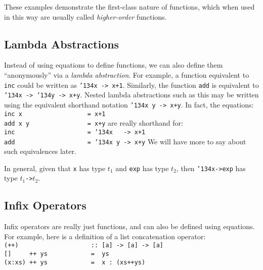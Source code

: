 These examples demonstrate the first-class nature of functions, which
when used in this way are usually called {\em higher-order} functions.

\subsection{Lambda Abstractions}
\label{tut-lambda}

Instead of using equations to define functions, we can also define
them ``anonymously'' via a {\em lambda abstraction}.  For example, a
function equivalent to \mbox{\tt inc} could be written as \mbox{\tt {\char'134}x\ ->\ x+1}.
Similarly, the function \mbox{\tt add} is equivalent to \mbox{\tt {\char'134}x\ ->\ {\char'134}y\ ->\ x+y}.
Nested lambda abstractions such as this may be written using the
equivalent shorthand notation \mbox{\tt {\char'134}x\ y\ ->\ x+y}.  In fact, the equations:
\bprog
\mbox{\tt inc\ x\ \ \ \ \ \ \ \ \ \ \ \ \ \ \ \ \ \ =\ x+1}\\
\mbox{\tt add\ x\ y\ \ \ \ \ \ \ \ \ \ \ \ \ \ \ \ =\ x+y}
\eprog 
are really shorthand for:
\bprog
\mbox{\tt inc\ \ \ \ \ \ \ \ \ \ \ \ \ \ \ \ \ \ \ \ =\ {\char'134}x\ \ \ ->\ x+1}\\
\mbox{\tt add\ \ \ \ \ \ \ \ \ \ \ \ \ \ \ \ \ \ \ \ =\ {\char'134}x\ y\ ->\ x+y}
\eprog 
We will have more to say about such equivalences later.

In general, given that \mbox{\tt x} has type $t_1$ and \mbox{\tt exp} has type $t_2$,
then \mbox{\tt {\char'134}x->exp} has type $t_1$\mbox{\tt ->}$t_2$.

\subsection{Infix Operators}
\label{tut-infix-ops}

Infix operators are really just functions, and can also be defined
using equations.  For example, here is a definition of a
list concatenation operator:
\bprog
\mbox{\tt (++)\ \ \ \ \ \ \ \ \ \ \ \ \ \ \ \ \ \ \ \ ::\ [a]\ ->\ [a]\ ->\ [a]}\\
\mbox{\tt []\ \ \ \ \ ++\ ys\ \ \ \ \ \ \ \ \ \ \ \ =\ \ ys}\\
\mbox{\tt (x:xs)\ ++\ ys\ \ \ \ \ \ \ \ \ \ \ \ =\ \ x\ :\ (xs++ys)}
\eprog 
{}

